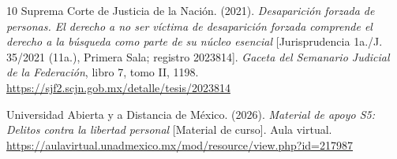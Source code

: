 \documentclass[spanish,letterpaper,oneside]{article}
\begin{document}
\begin{thebibliography}{10}
Suprema Corte de Justicia de la Nación. (2021). \emph{Desaparición forzada de personas. El derecho a no ser víctima de desaparición forzada comprende el derecho a la búsqueda como parte de su núcleo esencial} [Jurisprudencia 1a./J. 35/2021 (11a.), Primera Sala; registro 2023814]. \emph{Gaceta del Semanario Judicial de la Federación}, libro 7, tomo II, 1198. \url{https://sjf2.scjn.gob.mx/detalle/tesis/2023814}

Universidad Abierta y a Distancia de México. (2026). \emph{Material de apoyo S5: Delitos contra la libertad personal} [Material de curso]. Aula virtual. \url{https://aulavirtual.unadmexico.mx/mod/resource/view.php?id=217987}
\end{thebibliography}
\endgroup
\end{document}
